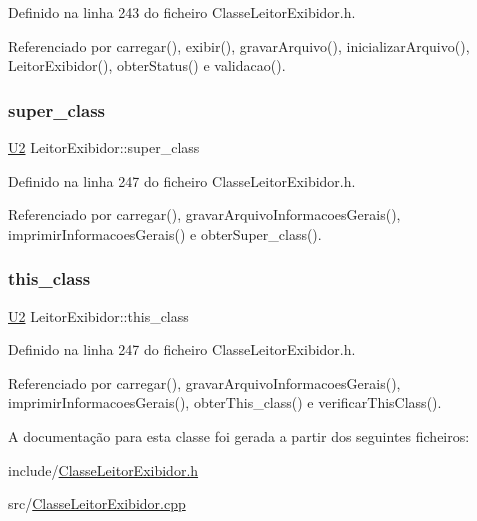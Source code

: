 Definido na linha 243 do ficheiro Classe\+Leitor\+Exibidor.\+h.



Referenciado por carregar(), exibir(), gravar\+Arquivo(), inicializar\+Arquivo(), Leitor\+Exibidor(), obter\+Status() e validacao().

\mbox{\label{classLeitorExibidor_adc9f3b119883f9bc4ba0323b8480c53e}} 
\subsubsection{\texorpdfstring{super\+\_\+class}{super\_class}}
{\footnotesize\ttfamily \hyperlink{BasicTypes_8h_a90240657108b1b457eef9d3f76e0202e}{U2} Leitor\+Exibidor\+::super\+\_\+class\hspace{0.3cm}{\ttfamily [private]}}



Definido na linha 247 do ficheiro Classe\+Leitor\+Exibidor.\+h.



Referenciado por carregar(), gravar\+Arquivo\+Informacoes\+Gerais(), imprimir\+Informacoes\+Gerais() e obter\+Super\+\_\+class().

\mbox{\label{classLeitorExibidor_ad85a876f6368ae8101343f4f35b53019}} 
\subsubsection{\texorpdfstring{this\+\_\+class}{this\_class}}
{\footnotesize\ttfamily \hyperlink{BasicTypes_8h_a90240657108b1b457eef9d3f76e0202e}{U2} Leitor\+Exibidor\+::this\+\_\+class\hspace{0.3cm}{\ttfamily [private]}}



Definido na linha 247 do ficheiro Classe\+Leitor\+Exibidor.\+h.



Referenciado por carregar(), gravar\+Arquivo\+Informacoes\+Gerais(), imprimir\+Informacoes\+Gerais(), obter\+This\+\_\+class() e verificar\+This\+Class().



A documentação para esta classe foi gerada a partir dos seguintes ficheiros\+:\begin{DoxyCompactItemize}
\item 
include/\hyperlink{ClasseLeitorExibidor_8h}{Classe\+Leitor\+Exibidor.\+h}\item 
src/\hyperlink{ClasseLeitorExibidor_8cpp}{Classe\+Leitor\+Exibidor.\+cpp}\end{DoxyCompactItemize}
